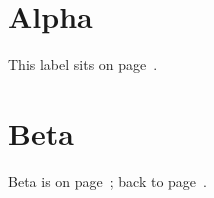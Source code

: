 \documentclass{article}
\begin{document}
\section{Alpha}
This label sits on page~.
\section{Beta}
Beta is on page~; back to page~.
\end{document}
